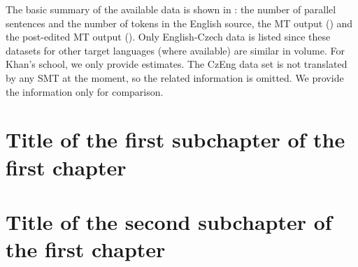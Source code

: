 The basic summary of the available data is shown in 
:
the
number of parallel sentences and the number of tokens in the English source, the
MT output () and the post-edited MT output (). Only
English-Czech data is listed since these datasets for other target languages
(where available) are similar in volume.
For Khan's school, we only
provide estimates. The CzEng data set is not translated by any SMT at the moment,
so the related information is omitted. We provide the information only for comparison.





\section{Title of the first subchapter of the first chapter}

\section{Title of the second subchapter of the first chapter}
